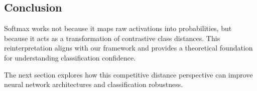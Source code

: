 \subsection{Conclusion}

Softmax works not because it maps raw activations into probabilities, but because it acts as a transformation of contrastive class distances. This reinterpretation aligns with our framework and provides a theoretical foundation for understanding classification confidence. 

The next section explores how this competitive distance perspective can improve neural network architectures and classification robustness.
